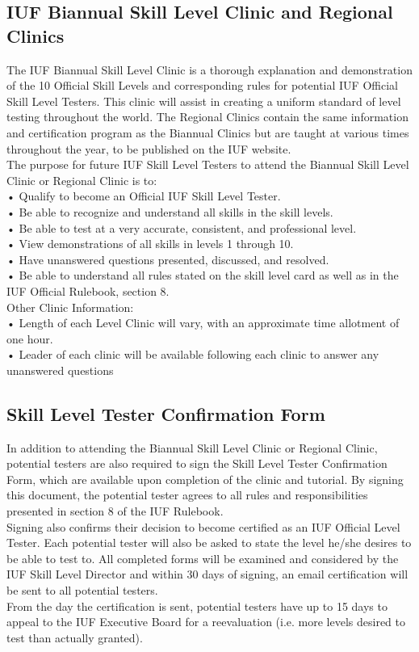 \subsection{ IUF Biannual Skill Level Clinic and Regional Clinics}
The IUF Biannual Skill Level Clinic is a thorough explanation and demonstration of the 10 Official Skill Levels and
corresponding rules for potential IUF Official Skill Level Testers. This clinic will assist in creating a uniform standard
of level testing throughout the world. The Regional Clinics contain the same information and certification program as
the Biannual Clinics but are taught at various times throughout the year, to be published on the IUF website.\\
The purpose for future IUF Skill Level Testers to attend the Biannual Skill Level Clinic or Regional Clinic is to:\\
• Qualify to become an Official IUF Skill Level Tester.\\
• Be able to recognize and understand all skills in the skill levels.\\
• Be able to test at a very accurate, consistent, and professional level.\\
• View demonstrations of all skills in levels 1 through 10.\\
• Have unanswered questions presented, discussed, and resolved.\\
• Be able to understand all rules stated on the skill level card as well as in the IUF Official Rulebook, section 8.\\
Other Clinic Information:\\
• Length of each Level Clinic will vary, with an approximate time allotment of one hour.\\
• Leader of each clinic will be available following each clinic to answer any unanswered questions\\
\subsection{ Skill Level Tester Confirmation Form}
In addition to attending the Biannual Skill Level Clinic or Regional Clinic, potential testers are also required to sign the
Skill Level Tester Confirmation Form, which are available upon completion of the clinic and tutorial. By signing this
document, the potential tester agrees to all rules and responsibilities presented in section 8 of the IUF Rulebook.\\
Signing also confirms their decision to become certified as an IUF Official Level Tester. Each potential tester will also
be asked to state the level he/she desires to be able to test to. All completed forms will be examined and considered by
the IUF Skill Level Director and within 30 days of signing, an email certification will be sent to all potential testers.\\
From the day the certification is sent, potential testers have up to 15 days to appeal to the IUF Executive Board for a
reevaluation (i.e. more levels desired to test than actually granted).
